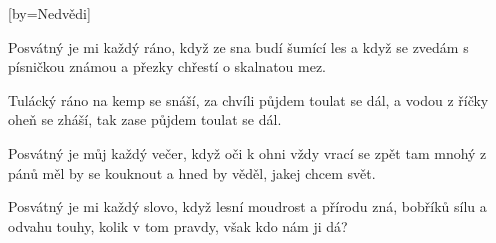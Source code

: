[by={Nedvědi}]

\beginverse{}
Posvátný je mi každý ráno, když ze sna budí šumící les
a když se zvedám s písničkou známou
a přezky chřestí o skalnatou mez.
\endverse{}

\beginchorus{}
Tulácký ráno na kemp se snáší, za chvíli půjdem toulat se dál,
a vodou z říčky oheň se zháší, tak zase půjdem toulat se dál.
\endchorus{}

\beginverse{}
Posvátný je můj každý večer, když oči k ohni vždy vrací se zpět
tam mnohý z pánů měl by se kouknout
a hned by věděl, jakej chcem svět.
\endverse{}

\beginchorus{}
\phantom{}
\endchorus{}

\beginverse{}
Posvátný je mi každý slovo, když lesní moudrost a přírodu zná,
bobříků sílu a odvahu touhy,
kolik v tom pravdy, však kdo nám ji dá?
\endverse{}

\beginchorus{}
\phantom{}
\endchorus{}

\endsong{}
